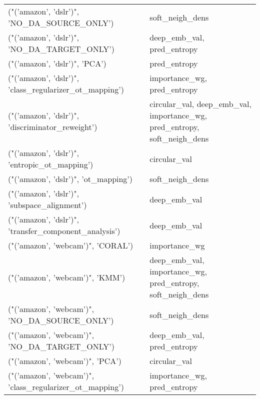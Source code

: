 \begin{tabular}{ll}
 ("('amazon', 'dslr')", 'NO\_DA\_SOURCE\_ONLY')               & soft\_neigh\_dens                                                          \\
 ("('amazon', 'dslr')", 'NO\_DA\_TARGET\_ONLY')               & deep\_emb\_val, pred\_entropy                                               \\
 ("('amazon', 'dslr')", 'PCA')                             & pred\_entropy                                                             \\
 ("('amazon', 'dslr')", 'class\_regularizer\_ot\_mapping')    & importance\_wg, pred\_entropy                                              \\
 ("('amazon', 'dslr')", 'discriminator\_reweight')          & circular\_val, deep\_emb\_val, importance\_wg, pred\_entropy, soft\_neigh\_dens \\
 ("('amazon', 'dslr')", 'entropic\_ot\_mapping')             & circular\_val                                                             \\
 ("('amazon', 'dslr')", 'ot\_mapping')                      & soft\_neigh\_dens                                                          \\
 ("('amazon', 'dslr')", 'subspace\_alignment')              & deep\_emb\_val                                                             \\
 ("('amazon', 'dslr')", 'transfer\_component\_analysis')     & deep\_emb\_val                                                             \\
 ("('amazon', 'webcam')", 'CORAL')                         & importance\_wg                                                            \\
 ("('amazon', 'webcam')", 'KMM')                           & deep\_emb\_val, importance\_wg, pred\_entropy, soft\_neigh\_dens               \\
 ("('amazon', 'webcam')", 'NO\_DA\_SOURCE\_ONLY')             & soft\_neigh\_dens                                                          \\
 ("('amazon', 'webcam')", 'NO\_DA\_TARGET\_ONLY')             & deep\_emb\_val, pred\_entropy                                               \\
 ("('amazon', 'webcam')", 'PCA')                           & circular\_val                                                             \\
 ("('amazon', 'webcam')", 'class\_regularizer\_ot\_mapping')  & importance\_wg, pred\_entropy                                              \\

\end{tabular}
